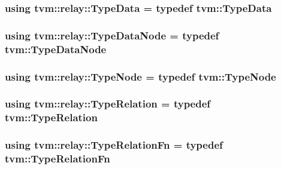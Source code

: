 \subsubsection[{\texorpdfstring{Type\+Data}{TypeData}}]{\setlength{\rightskip}{0pt plus 5cm}using {\bf tvm\+::relay\+::\+Type\+Data} = typedef {\bf tvm\+::\+Type\+Data}}\hypertarget{namespacetvm_1_1relay_a6e725a1cb4c83346e261eac7dc7292a8}{}\label{namespacetvm_1_1relay_a6e725a1cb4c83346e261eac7dc7292a8}
\subsubsection[{\texorpdfstring{Type\+Data\+Node}{TypeDataNode}}]{\setlength{\rightskip}{0pt plus 5cm}using {\bf tvm\+::relay\+::\+Type\+Data\+Node} = typedef {\bf tvm\+::\+Type\+Data\+Node}}\hypertarget{namespacetvm_1_1relay_a2b8c0d5920eaca88569907e92df6066f}{}\label{namespacetvm_1_1relay_a2b8c0d5920eaca88569907e92df6066f}
\subsubsection[{\texorpdfstring{Type\+Node}{TypeNode}}]{\setlength{\rightskip}{0pt plus 5cm}using {\bf tvm\+::relay\+::\+Type\+Node} = typedef {\bf tvm\+::\+Type\+Node}}\hypertarget{namespacetvm_1_1relay_af6995f0c848d0d5cc4124a38f43aaf12}{}\label{namespacetvm_1_1relay_af6995f0c848d0d5cc4124a38f43aaf12}
\subsubsection[{\texorpdfstring{Type\+Relation}{TypeRelation}}]{\setlength{\rightskip}{0pt plus 5cm}using {\bf tvm\+::relay\+::\+Type\+Relation} = typedef {\bf tvm\+::\+Type\+Relation}}\hypertarget{namespacetvm_1_1relay_adab0d56fd993df71df3068dea0cd5456}{}\label{namespacetvm_1_1relay_adab0d56fd993df71df3068dea0cd5456}
\subsubsection[{\texorpdfstring{Type\+Relation\+Fn}{TypeRelationFn}}]{\setlength{\rightskip}{0pt plus 5cm}using {\bf tvm\+::relay\+::\+Type\+Relation\+Fn} = typedef {\bf tvm\+::\+Type\+Relation\+Fn}}\hypertarget{namespacetvm_1_1relay_af253112249297a6cfb2a9b94cde0f235}{}\label{namespacetvm_1_1relay_af253112249297a6cfb2a9b94cde0f235}
